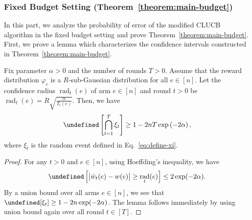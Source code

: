 \documentclass{article}
\newcommand{\Algorithm}{{\small \textsf{CLUCB}}\xspace}
\newcommand{\Rew}{\varphi}
\DeclareMathOperator{\rad}{rad}
\let\Pr\undefined
\DeclareMathOperator{\Pr}{Pr}
\begin{document}
\subsubsection{Fixed Budget Setting (Theorem~\ref{theorem:main-budget})}
In this part, we analyze the probability of error of the modified \Algorithm algorithm in the fixed budget setting and prove Theorem~\ref{theorem:main-budget}. 
First, we prove a lemma which characterizes the confidence intervals constructed in Theorem~\ref{theorem:main-budget}.
\begin{lemma}
Fix parameter $\alpha > 0$ and the number of rounds $T > 0$.
Assume that the reward distribution $\Rew_e$ is a $R$-sub-Gaussian distribution for all $e\in [n]$.
Let the confidence radius $\rad_t(e)$ of arm $e\in[n]$ and round $t>0$ be 
$\rad_t(e)=R\sqrt{\frac{\alpha}{T_t(e)}}.$
Then, we have
$$
\Pr\left[\bigcap_{t=1}^T \xi_t \right] \ge 1-2nT\exp\left(-2\alpha\right),
$$
where $\xi_t$ is the random event defined in Eq.~\eqref{eq:define-xi}.
\label{lemma:ci-budget}
\end{lemma}
\begin{proof}
For any $t>0$ and $e\in[n]$, using Hoeffding's inequality, we have
$$
\Pr\left[ \big|\bar w_t(e)-w(e) \big| \ge \rad_t(e) \right] \le 2\exp(-2\alpha).
$$
By a union bound over all arms $e\in[n]$, we see that $\Pr[\xi_t] \ge 1-2n\exp(-2\alpha)$. 
The lemma follows immediately by using union bound again over all round $t\in [T]$.
\end{proof}
\end{document}

